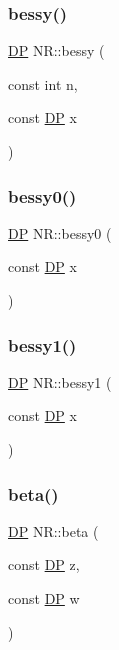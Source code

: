 \subsubsection{\texorpdfstring{bessy()}{bessy()}}
{\footnotesize\ttfamily \mbox{\hyperlink{namespaceNR_af6ff762dd605ff477b8e52387253a02a}{DP}} N\+R\+::bessy (\begin{DoxyParamCaption}\item[{const int}]{n,  }\item[{const \mbox{\hyperlink{namespaceNR_af6ff762dd605ff477b8e52387253a02a}{DP}}}]{x }\end{DoxyParamCaption})}

\mbox{\label{namespaceNR_ae31454cfbd454b6de0460f0e08ef933b}} 
\subsubsection{\texorpdfstring{bessy0()}{bessy0()}}
{\footnotesize\ttfamily \mbox{\hyperlink{namespaceNR_af6ff762dd605ff477b8e52387253a02a}{DP}} N\+R\+::bessy0 (\begin{DoxyParamCaption}\item[{const \mbox{\hyperlink{namespaceNR_af6ff762dd605ff477b8e52387253a02a}{DP}}}]{x }\end{DoxyParamCaption})}

\mbox{\label{namespaceNR_ae507795ea35c6716c6bf449c48af314f}} 
\subsubsection{\texorpdfstring{bessy1()}{bessy1()}}
{\footnotesize\ttfamily \mbox{\hyperlink{namespaceNR_af6ff762dd605ff477b8e52387253a02a}{DP}} N\+R\+::bessy1 (\begin{DoxyParamCaption}\item[{const \mbox{\hyperlink{namespaceNR_af6ff762dd605ff477b8e52387253a02a}{DP}}}]{x }\end{DoxyParamCaption})}

\mbox{\label{namespaceNR_a060c1496967431dfd707b603985a33b7}} 
\subsubsection{\texorpdfstring{beta()}{beta()}}
{\footnotesize\ttfamily \mbox{\hyperlink{namespaceNR_af6ff762dd605ff477b8e52387253a02a}{DP}} N\+R\+::beta (\begin{DoxyParamCaption}\item[{const \mbox{\hyperlink{namespaceNR_af6ff762dd605ff477b8e52387253a02a}{DP}}}]{z,  }\item[{const \mbox{\hyperlink{namespaceNR_af6ff762dd605ff477b8e52387253a02a}{DP}}}]{w }\end{DoxyParamCaption})}

